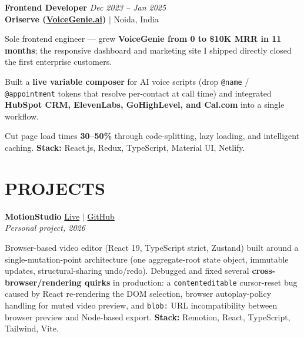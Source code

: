 \documentclass[a4paper,10pt]{article}
\begin{document}
\vspace{3pt}

\textbf{Frontend Developer} \hfill \textit{Dec 2023 -- Jan 2025}\\
\textbf{Oriserve (\href{https://voicegenie.ai/}{VoiceGenie.ai})} $|$ Noida, India

\vspace{2pt}
\begin{itemize}[leftmargin=0.15in, itemsep=1pt]
    \small{\item
    Sole frontend engineer --- grew \textbf{VoiceGenie from 0 to \$10K MRR in 11 months}; the responsive dashboard and marketing site I shipped directly closed the first enterprise customers.
    }

    \small{\item
    Built a \textbf{live variable composer} for AI voice scripts (drop \texttt{@name} / \texttt{@appointment} tokens that resolve per-contact at call time) and integrated \textbf{HubSpot CRM, ElevenLabs, GoHighLevel, and Cal.com} into a single workflow.
    }

    \small{\item
    Cut page load times \textbf{30--50\%} through code-splitting, lazy loading, and intelligent caching. \textbf{Stack:} React.js, Redux, TypeScript, Material UI, Netlify.
    }
\end{itemize}

\vspace{3pt}

\section{PROJECTS}

\textbf{MotionStudio} \hfill \href{https://motionstudio-six.vercel.app/}{Live} $|$ \href{https://github.com/BLAZE7SHADOW/MotionStudio}{GitHub}\\
\textit{Personal project, 2026}

\vspace{2pt}
\begin{itemize}[leftmargin=0.15in, itemsep=1pt]
    \small{\item
    Browser-based video editor (React 19, TypeScript strict, Zustand) built around a single-mutation-point architecture (one aggregate-root state object, immutable updates, structural-sharing undo/redo). Debugged and fixed several \textbf{cross-browser/rendering quirks} in production: a \texttt{contenteditable} cursor-reset bug caused by React re-rendering the DOM selection, browser autoplay-policy handling for muted video preview, and \texttt{blob:} URL incompatibility between browser preview and Node-based export. \textbf{Stack:} Remotion, React, TypeScript, Tailwind, Vite.
    }
\end{itemize}
\end{document}
